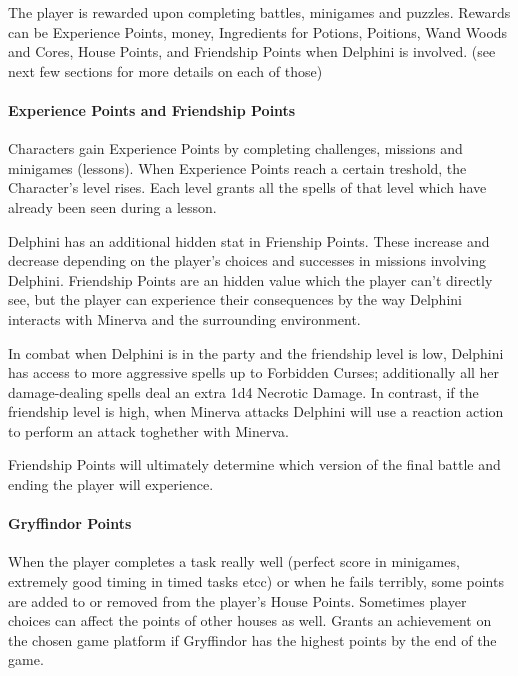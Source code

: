The player is rewarded upon completing battles, minigames and puzzles. Rewards can be Experience Points, money, Ingredients for Potions, Poitions, Wand Woods and Cores, House Points, and Friendship Points when Delphini is involved. (see next few sections for more details on each of those)


\paragraph{Experience Points and Friendship Points}

Characters gain Experience Points by completing challenges, missions and minigames (lessons). When Experience Points reach a certain treshold, the Character's level rises. 
Each level grants all the spells of that level which have already been seen during a lesson.

Delphini has an additional hidden stat in Frienship Points. These increase and decrease depending on the player's choices and successes in missions involving Delphini. Friendship Points are an hidden value which the player can't directly see, but the player can experience their consequences by the way Delphini interacts with Minerva and the surrounding environment.

In combat when Delphini is in the party and the friendship level is low, Delphini has access to more aggressive spells up to Forbidden Curses; additionally all her damage-dealing spells deal an extra 1d4 Necrotic Damage. In contrast, if the friendship level is high, when Minerva attacks Delphini will use a reaction action to perform an attack toghether with Minerva.

Friendship Points will ultimately determine which version of the final battle and ending the player will experience.

\paragraph{Gryffindor Points}

When the player completes a task really well (perfect score in minigames, extremely good timing in timed tasks etcc) or when he fails terribly, some points are added to or removed from the player's House Points. Sometimes player choices can affect the points of other houses as well.
Grants an achievement on the chosen game platform if Gryffindor has the highest points by the end of the game.

\pagebreak